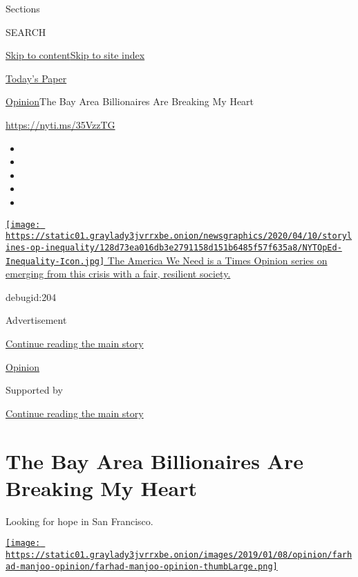 Sections

SEARCH

\protect\hyperlink{site-content}{Skip to
content}\protect\hyperlink{site-index}{Skip to site index}

\href{https://myaccount.nytimes3xbfgragh.onion/auth/login?response_type=cookie\&client_id=vi}{}

\href{https://www.nytimes3xbfgragh.onion/section/todayspaper}{Today's
Paper}

\href{/section/opinion}{Opinion}\textbar{}The Bay Area Billionaires Are
Breaking My Heart

\url{https://nyti.ms/35VzzTG}

\begin{itemize}
\item
\item
\item
\item
\item
\end{itemize}

\href{https://www.nytimes3xbfgragh.onion/interactive/2020/opinion/america-inequality-coronavirus.html?action=click\&pgtype=Article\&state=default\&region=TOP_BANNER\&context=storylines_menu}{\texttt{[image: https://static01.graylady3jvrrxbe.onion/newsgraphics/2020/04/10/storylines-op-inequality/128d73ea016db3e2791158d151b6485f57f635a8/NYTOpEd-Inequality-Icon.jpg]}
The America We Need is a Times Opinion series on emerging from this
crisis with a fair, resilient society. }

debugid:204

Advertisement

\protect\hyperlink{after-top}{Continue reading the main story}

\href{/section/opinion}{Opinion}

Supported by

\protect\hyperlink{after-sponsor}{Continue reading the main story}

\hypertarget{the-bay-area-billionaires-are-breaking-my-heart}{%
\section{The Bay Area Billionaires Are Breaking My
Heart}\label{the-bay-area-billionaires-are-breaking-my-heart}}

Looking for hope in San Francisco.

\href{https://www.nytimes3xbfgragh.onion/by/farhad-manjoo}{\texttt{[image: https://static01.graylady3jvrrxbe.onion/images/2019/01/08/opinion/farhad-manjoo-opinion/farhad-manjoo-opinion-thumbLarge.png]}}

